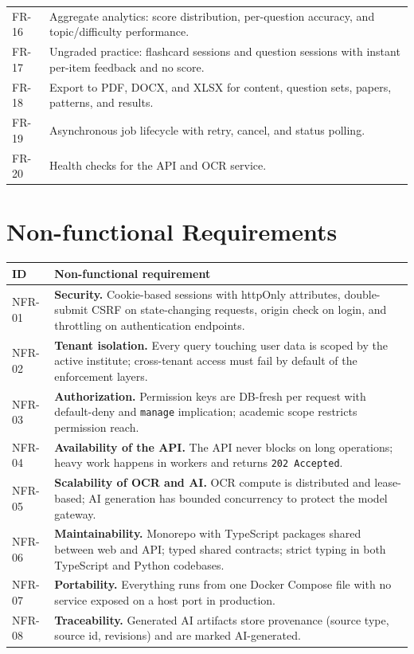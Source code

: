 \begin{center}
\begin{longtable}{@{}p{1.6cm}p{12.4cm}@{}}
FR-16 & Aggregate analytics: score distribution, per-question accuracy, and
topic/difficulty performance. \\
FR-17 & Ungraded practice: flashcard sessions and question sessions with
instant per-item feedback and no score. \\
FR-18 & Export to PDF, DOCX, and XLSX for content, question sets, papers,
patterns, and results. \\
FR-19 & Asynchronous job lifecycle with retry, cancel, and status polling. \\
FR-20 & Health checks for the API and OCR service. \\
\bottomrule
\end{longtable}
\end{center}

\section{Non-functional Requirements}

\begin{center}
\small
\begin{longtable}{@{}p{1.6cm}p{12.4cm}@{}}
\toprule
\textbf{ID} & \textbf{Non-functional requirement} \\
\midrule
\endhead
NFR-01 & \textbf{Security.} Cookie-based sessions with httpOnly attributes,
double-submit CSRF on state-changing requests, origin check on login, and
throttling on authentication endpoints. \\
NFR-02 & \textbf{Tenant isolation.} Every query touching user data is scoped
by the active institute; cross-tenant access must fail by default of the
enforcement layers. \\
NFR-03 & \textbf{Authorization.} Permission keys are DB-fresh per request with
default-deny and \texttt{manage} implication; academic scope restricts
permission reach. \\
NFR-04 & \textbf{Availability of the API.} The API never blocks on long
operations; heavy work happens in workers and returns \texttt{202 Accepted}. \\
NFR-05 & \textbf{Scalability of OCR and AI.} OCR compute is distributed and
lease-based; AI generation has bounded concurrency to protect the model
gateway. \\
NFR-06 & \textbf{Maintainability.} Monorepo with TypeScript packages shared
between web and API; typed shared contracts; strict typing in both TypeScript
and Python codebases. \\
NFR-07 & \textbf{Portability.} Everything runs from one Docker Compose file
with no service exposed on a host port in production. \\
NFR-08 & \textbf{Traceability.} Generated AI artifacts store provenance
(source type, source id, revisions) and are marked AI-generated. \\
\bottomrule
\end{longtable}
\end{center}

